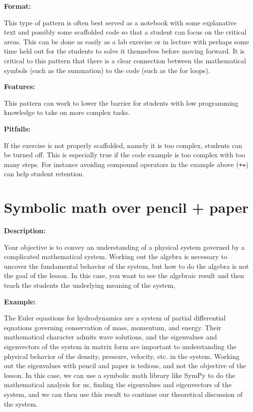 \documentclass[]{book}
\begin{document}
\textbf{Format:}

This type of pattern is often best served as a notebook with some
explanative text and possibly some scaffolded code so that a student can
focus on the critical areas. This can be done as easily as a lab
exercise or in lecture with perhaps some time held out for the students
to solve it themselves before moving forward. It is critical to this
pattern that there is a clear connection between the mathematical
symbols (such as the summation) to the code (such as the for loops).

\textbf{Features:}

This pattern can work to lower the barrier for students with low
programming knowledge to take on more complex tasks.

\textbf{Pitfalls:}

If the exercise is not properly scaffolded, namely it is too complex,
students can be turned off. This is especially true if the code example
is too complex with too many steps. For instance avoiding compound
operators in the example above (\texttt{+=}) can help student retention.

\section{Symbolic math over pencil +
paper}\label{symbolic-math-over-pencil-paper}

\textbf{Description:}

Your objective is to convey an understanding of a physical system
governed by a complicated mathematical system. Working out the algebra
is necessary to uncover the fundamental behavior of the system, but how
to do the algebra is not the goal of the lesson. In this case, you want
to see the algebraic result and then teach the students the underlying
meaning of the system,

\textbf{Example:}

The Euler equations for hydrodynamics are a system of partial
differential equations governing conservation of mass, momentum, and
energy. Their mathematical character admits wave solutions, and the
eigenvalues and eigenvectors of the system in matrix form are important
to understanding the physical behavior of the density, pressure,
velocity, etc. in the system. Working out the eigenvalues with pencil
and paper is tedious, and not the objective of the lesson. In this case,
we can use a symbolic math library like SymPy to do the mathematical
analysis for us, finding the eigenvalues and eigenvectors of the system,
and we can then use this result to continue our theoretical discussion
of the system.
\end{document}
